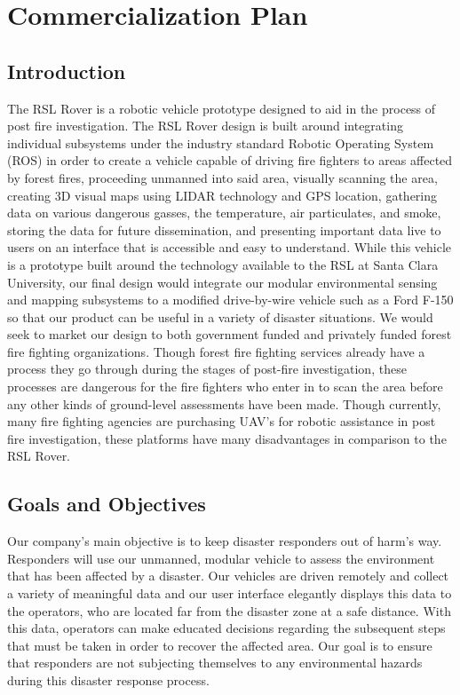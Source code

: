 \chapter{Commercialization Plan}

\section{Introduction}

The RSL Rover is a robotic vehicle prototype designed to aid in the process of post fire investigation. The RSL Rover design is built around integrating individual subsystems under the industry standard Robotic Operating System (ROS) in order to create a vehicle capable of driving fire fighters to areas affected by forest fires, proceeding unmanned into said area, visually scanning the area, creating 3D visual maps using LIDAR technology and GPS location, gathering data on various dangerous gasses, the temperature, air particulates, and smoke, storing the data for future dissemination, and presenting important data live to users on an interface that is accessible and easy to understand. While this vehicle is a prototype built around the technology available to the RSL at Santa Clara University, our final design would integrate our modular environmental sensing and mapping subsystems to a modified drive-by-wire vehicle such as a Ford F-150 so that our product can be useful in a variety of disaster situations. We would seek to market our design to both government funded and privately funded forest fire fighting organizations. Though forest fire fighting services already have a process they go through during the stages of post-fire investigation, these processes are dangerous for the fire fighters who enter in to scan the area before any other kinds of ground-level assessments have been made. Though currently, many fire fighting agencies are purchasing UAV's for robotic assistance in post fire investigation, these platforms have many disadvantages in comparison to the RSL Rover.

\section{Goals and Objectives}

Our company's main objective is to keep disaster responders out of harm's way. Responders will use our unmanned, modular vehicle to assess the environment that has been affected by a disaster. Our vehicles are driven remotely and collect a variety of meaningful data and our user interface elegantly displays this data to the operators, who are located far from the disaster zone at a safe distance. With this data, operators can make educated decisions regarding the subsequent steps that must be taken in order to recover the affected area. Our goal is to ensure that responders are not subjecting themselves to any environmental hazards during this disaster response process. 

